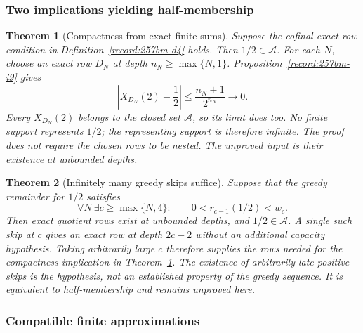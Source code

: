 \documentclass[11pt]{article}
\theoremstyle{plain}
\newtheorem{thm}{Theorem}[section]
\theoremstyle{definition}
\theoremstyle{remark}
\begin{document}
\subsubsection*{Two implications yielding half-membership}

\begin{thm}[Compactness from exact finite sums]\label{record:257bm-c1}
Suppose the cofinal exact-row condition in
Definition~\ref{record:257bm-d4} holds.  Then $1/2\in\mathcal A$.
For each $N$, choose an exact row $D_N$ at depth
$n_N\ge\max\{N,1\}$.  Proposition~\ref{record:257bm-i9} gives
\[
 \left|X_{D_N}(2)-\frac12\right|
       \le\frac{n_N+1}{2^{n_N}}\longrightarrow0.
\]
Every $X_{D_N}(2)$ belongs to the closed set $\mathcal A$, so
its limit does too.  No finite support represents $1/2$;
the representing support is therefore infinite.
The proof does not require the chosen rows to be nested.
The unproved input is their existence at unbounded depths.
\end{thm}

\begin{thm}[Infinitely many greedy skips suffice]\label{record:257bm-c2}
Suppose that the greedy remainder for $1/2$ satisfies
\[
 \forall N\ \exists c\ge\max\{N,4\}:\qquad
 0<r_{c-1}(1/2)<w_c.
\]
Then exact quotient rows exist at unbounded depths, and $1/2\in\mathcal A$.
A single such skip at $c$ gives an exact row at depth $2c-2$ without
an additional capacity hypothesis.  Taking arbitrarily large $c$
therefore supplies the rows needed for the compactness implication
in Theorem~\ref{record:257bm-c1}.
The existence of arbitrarily late positive skips is the hypothesis,
not an established property of the greedy sequence.  It is equivalent
to half-membership and remains unproved here.
\end{thm}

\subsubsection*{Compatible finite approximations}
\end{document}
